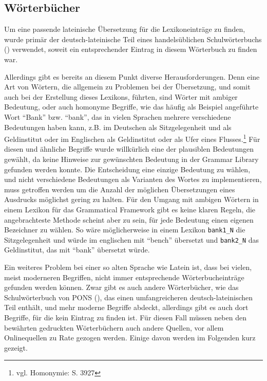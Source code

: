 \subsection{Wörterbücher}
\label{subsec:woerterbuch}
Um eine passende lateinische Übersetzung für die Lexikoneinträge zu finden, wurde primär der deutsch-lateinische Teil eines handelsüblichen Schulwörterbuchs (\cite{LANGENSCHEIDT1981}) verwendet, soweit ein entsprechender Eintrag in diesem Wörterbuch zu finden war. \par
Allerdings gibt es bereits an diesem Punkt diverse Herausforderungen. Denn eine Art von Wörtern, die allgemein zu Problemen bei der Übersetzung, und somit auch bei der Erstellung dieses Lexikons, führten, sind Wörter mit ambiger Bedeutung, oder auch homonyme Begriffe, wie das häufig als Beispiel angeführte Wort "`Bank"' bzw. "`bank"', das in vielen Sprachen mehrere verschiedene Bedeutungen haben kann, z.B. im Deutschen als Sitzgelegenheit und als Geldinstitut oder im Englischen als Geldinstitut oder als Ufer eines Flusses.\footnote{vgl. \cite{METZLER2004} Homonymie: S. 3927} Für diesen und ähnliche Begriffe wurde willkürlich eine der plausiblen Bedeutungen gewählt, da keine Hinweise zur gewünschten Bedeutung in der Grammar Library gefunden werden konnte. Die Entscheidung eine einzige Bedeutung zu wählen, und nicht verschiedene Bedeutungen als Varianten des Wortes zu implementieren, muss getroffen werden um die Anzahl der möglichen Übersetzungen eines Ausdrucks möglichst gering zu halten. Für den Umgang mit ambigen Wörtern in einem Lexikon für das Grammatical Framework gibt es keine klaren Regeln, die angebrachteste Methode scheint aber zu sein, für jede Bedeutung einen eigenen Bezeichner zu wählen. So wäre möglicherweise in einem Lexikon \texttt{bank1\_N} die Sitzgelegenheit und würde im englischen mit "`bench"' übersetzt und \texttt{bank2\_N} das Geldinstitut, das mit "`bank"' übersetzt würde.\par
Ein weiteres Problem bei einer so alten Sprache wie Latein ist, dass bei vielen, meist moderneren Begriffen, nicht immer entsprechende Wörterbucheinträge gefunden werden können. Zwar gibt es auch andere Wörterbücher, wie das Schulwörterbuch von PONS (\cite{PONS2012}), das einen umfangreicheren deutsch-lateinischen Teil enthält, und mehr moderne Begriffe abdeckt, allerdings gibt es auch dort Begriffe, für die kein Eintrag zu finden ist. Für diesen Fall müssen neben den bewährten gedruckten Wörterbüchern auch andere Quellen, vor allem Onlinequellen zu Rate gezogen werden. Einige davon werden im Folgenden kurz gezeigt.\par
